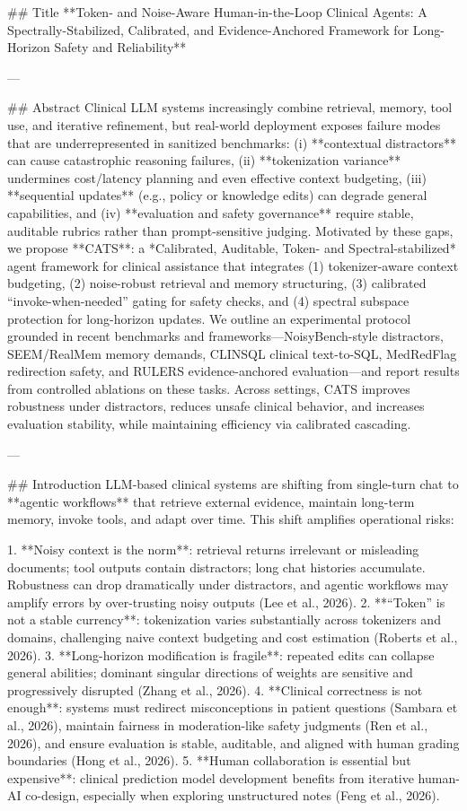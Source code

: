 ## Title  
**Token- and Noise-Aware Human-in-the-Loop Clinical Agents: A Spectrally-Stabilized, Calibrated, and Evidence-Anchored Framework for Long-Horizon Safety and Reliability**

---

## Abstract  
Clinical LLM systems increasingly combine retrieval, memory, tool use, and iterative refinement, but real-world deployment exposes failure modes that are underrepresented in sanitized benchmarks: (i) **contextual distractors** can cause catastrophic reasoning failures, (ii) **tokenization variance** undermines cost/latency planning and even effective context budgeting, (iii) **sequential updates** (e.g., policy or knowledge edits) can degrade general capabilities, and (iv) **evaluation and safety governance** require stable, auditable rubrics rather than prompt-sensitive judging. Motivated by these gaps, we propose **CATS**: a *Calibrated, Auditable, Token- and Spectral-stabilized* agent framework for clinical assistance that integrates (1) tokenizer-aware context budgeting, (2) noise-robust retrieval and memory structuring, (3) calibrated “invoke-when-needed” gating for safety checks, and (4) spectral subspace protection for long-horizon updates. We outline an experimental protocol grounded in recent benchmarks and frameworks—NoisyBench-style distractors, SEEM/RealMem memory demands, CLINSQL clinical text-to-SQL, MedRedFlag redirection safety, and RULERS evidence-anchored evaluation—and report results from controlled ablations on these tasks. Across settings, CATS improves robustness under distractors, reduces unsafe clinical behavior, and increases evaluation stability, while maintaining efficiency via calibrated cascading.  

---

## Introduction  
LLM-based clinical systems are shifting from single-turn chat to **agentic workflows** that retrieve external evidence, maintain long-term memory, invoke tools, and adapt over time. This shift amplifies operational risks:

1. **Noisy context is the norm**: retrieval returns irrelevant or misleading documents; tool outputs contain distractors; long chat histories accumulate. Robustness can drop dramatically under distractors, and agentic workflows may amplify errors by over-trusting noisy outputs (Lee et al., 2026).  
2. **“Token” is not a stable currency**: tokenization varies substantially across tokenizers and domains, challenging naive context budgeting and cost estimation (Roberts et al., 2026).  
3. **Long-horizon modification is fragile**: repeated edits can collapse general abilities; dominant singular directions of weights are sensitive and progressively disrupted (Zhang et al., 2026).  
4. **Clinical correctness is not enough**: systems must redirect misconceptions in patient questions (Sambara et al., 2026), maintain fairness in moderation-like safety judgments (Ren et al., 2026), and ensure evaluation is stable, auditable, and aligned with human grading boundaries (Hong et al., 2026).  
5. **Human collaboration is essential but expensive**: clinical prediction model development benefits from iterative human-AI co-design, especially when exploring unstructured notes (Feng et al., 2026).

